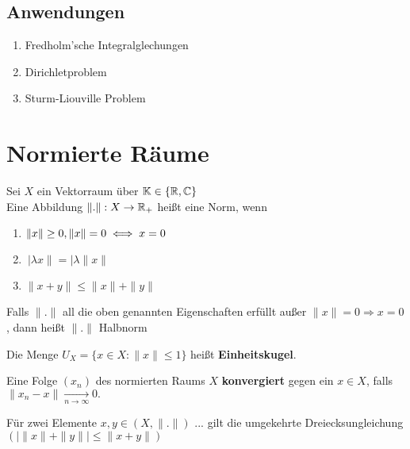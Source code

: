 \subsection{Anwendungen}

\begin{enumerate}
	\item Fredholm'sche Integralglechungen
	\item Dirichletproblem
	\item Sturm-Liouville Problem
\end{enumerate}


\newpage
\section{Normierte Räume}

\begin{definition}
Sei $X$ ein Vektorraum über $\mathbb{K} \in\{ \mathbb{R}, \mathbb{C} \}$ \\
Eine Abbildung  $\| . \| : X \rightarrow \mathbb{R}_{+}$ heißt eine Norm, wenn
\begin{enumerate}
	\item $ \| x \| \geq 0, \| x \| = 0 \iff x = 0 $
	\item $\ | \lambda x \| = | \lambda \| x \| $
	\item $ \| x + y \| \leq \| x \| + \| y \| $
\end{enumerate}	
\end{definition}

\begin{bemerkung} Falls $ \| . \| $ all die oben genannten Eigenschaften erfüllt außer $ \| x \| = 0 \Rightarrow x = 0 $, dann heißt $ \| . \| $ Halbnorm %
\end{bemerkung}

Die Menge $ U_{X} = \{ x \in X:  \|x \| \leq 1 \}$ heißt \textbf{Einheitskugel}.

Eine Folge $(x_{n})$ des normierten Raums $X$ \textbf{konvergiert} gegen ein $ x \in X $, falls  $\| x_{n} - x \| \xrightarrow[n \rightarrow \infty]{} 0. $


\begin{bemerkung}
Für zwei Elemente $x, y \in (X, \|.\|)$	... gilt die umgekehrte Dreiecksungleichung $( | \|x\| + \|y\| | \leq \| x + y \|)$
\end{bemerkung}

